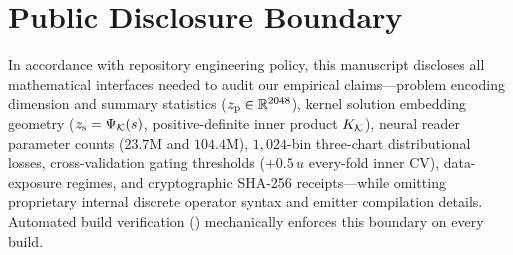 \section{Public Disclosure Boundary}
\label{app:disclosure}

In accordance with repository engineering policy, this manuscript discloses all mathematical interfaces needed to audit our empirical claims---problem encoding dimension and summary statistics ($z_{\mathrm{p}} \in \mathbb{R}^{2048}$), kernel solution embedding geometry ($z_{\mathrm{s}} = \Psi_{\mathcal{K}}(s)$, positive-definite inner product $K_{\mathcal{K}}$), neural reader parameter counts ($23.7\mathrm{M}$ and $104.4\mathrm{M}$), $1{,}024$-bin three-chart distributional losses, cross-validation gating thresholds ($+0.5\,u$ every-fold inner CV), data-exposure regimes, and cryptographic SHA-256 receipts---while omitting proprietary internal discrete operator syntax and emitter compilation details. Automated build verification () mechanically enforces this boundary on every build.
